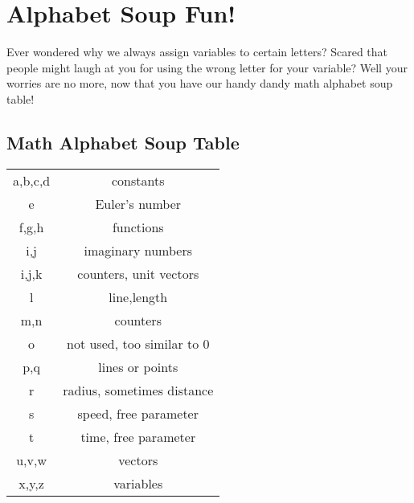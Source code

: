 \documentclass{article}
\begin{document}
\section{Alphabet Soup Fun!}
Ever wondered why we always assign variables to certain letters?
Scared that people might laugh at you for using the wrong letter for your variable?
Well your worries are no more, now that you have our handy dandy math alphabet soup table!\\

\begin{center}
    \section*{Math Alphabet Soup Table}
    \begin{center}
    \begin{tabular}{ c c}
    a,b,c,d & constants\\
    e & Euler's number\\
    f,g,h & functions\\
    i,j & imaginary numbers\\
    i,j,k & counters, unit vectors\\
    l & line,length\\
    m,n & counters\\
    o & not used, too similar to 0\\
    p,q & lines or points\\
    r & radius, sometimes distance\\
    s & speed, free parameter\\
    t & time, free parameter \\
    u,v,w & vectors\\
    x,y,z & variables\\
    \end{tabular}
    \end{center}
    
\end{center}
\end{document}
